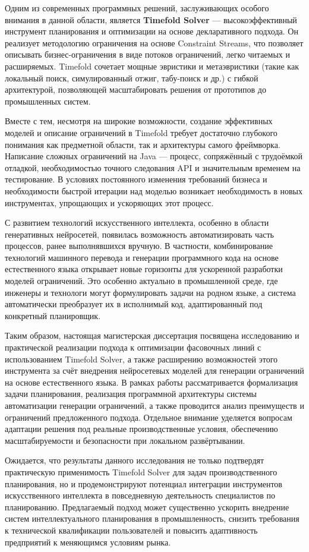 Одним из современных программных решений, заслуживающих особого внимания в данной области, является \textbf{Timefold Solver} — высокоэффективный инструмент планирования и оптимизации на основе декларативного подхода. Он реализует методологию ограничения на основе Constraint Streams, что позволяет описывать бизнес-ограничения в виде потоков ограничений, легко читаемых и расширяемых. Timefold сочетает мощные эвристики и метаэвристики (такие как локальный поиск, симулированный отжиг, табу-поиск и др.) с гибкой архитектурой, позволяющей масштабировать решения от прототипов до промышленных систем.

Вместе с тем, несмотря на широкие возможности, создание эффективных моделей и описание ограничений в Timefold требует достаточно глубокого понимания как предметной области, так и архитектуры самого фреймворка. Написание сложных ограничений на Java — процесс, сопряжённый с трудоёмкой отладкой, необходимостью точного следования API и значительным временем на тестирование. В условиях постоянного изменения требований бизнеса и необходимости быстрой итерации над моделью возникает необходимость в новых инструментах, упрощающих и ускоряющих этот процесс.

С развитием технологий искусственного интеллекта, особенно в области генеративных нейросетей, появилась возможность автоматизировать часть процессов, ранее выполнявшихся вручную. В частности, комбинирование технологий машинного перевода и генерации программного кода на основе естественного языка открывает новые горизонты для ускоренной разработки моделей ограничений. Это особенно актуально в промышленной среде, где инженеры и технологи могут формулировать задачи на родном языке, а система автоматически преобразует их в исполнимый код, адаптированный под конкретный планировщик.

Таким образом, настоящая магистерская диссертация посвящена исследованию и практической реализации подхода к оптимизации фасовочных линий с использованием Timefold Solver, а также расширению возможностей этого инструмента за счёт внедрения нейросетевых моделей для генерации ограничений на основе естественного языка. В рамках работы рассматривается формализация задачи планирования, реализация программной архитектуры системы автоматизации генерации ограничений, а также проводится анализ преимуществ и ограничений предложенного подхода. Отдельное внимание уделяется вопросам адаптации решения под реальные производственные условия, обеспечению масштабируемости и безопасности при локальном развёртывании.

Ожидается, что результаты данного исследования не только подтвердят практическую применимость Timefold Solver для задач производственного планирования, но и продемонстрируют потенциал интеграции инструментов искусственного интеллекта в повседневную деятельность специалистов по планированию. Предлагаемый подход может существенно ускорить внедрение систем интеллектуального планирования в промышленность, снизить требования к технической квалификации пользователей и повысить адаптивность предприятий к меняющимся условиям рынка.
